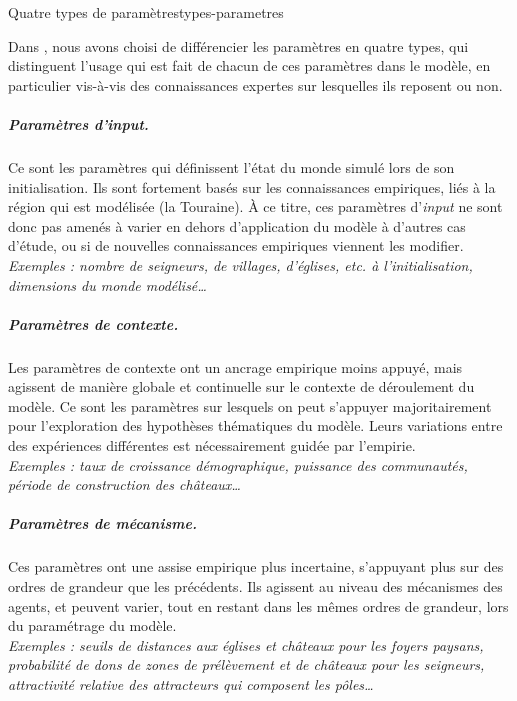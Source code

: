 \begin{encadre}{Quatre types de paramètres}{types-parametres}
\renewcommand{\thempfootnote}{\alph{mpfootnote}}

Dans \simfeodal{}, nous avons choisi de différencier les paramètres en quatre \og types\fg{}, qui distinguent l'usage	qui est fait de chacun de ces paramètres dans le modèle, en particulier vis-à-vis des connaissances expertes sur lesquelles ils reposent ou non.\vspace*{-1em}
	
\subparagraph*{Paramètres d'\textit{input}.}
	Ce sont les paramètres qui définissent l'état du monde simulé lors de son initialisation.
	Ils sont fortement basés sur les connaissances empiriques, liés à la région qui est modélisée (la Touraine).
	À ce titre, ces paramètres d'\textit{input} ne sont donc pas amenés à varier en dehors d'application du modèle à d'autres cas d'étude, ou si de nouvelles connaissances empiriques viennent les modifier.\\
	\textit{Exemples : nombre de seigneurs, de villages, d'églises, etc. à l'initialisation, dimensions du monde modélisé\ldots}\vspace*{-1em}

\subparagraph*{Paramètres de contexte.}
	Les paramètres de contexte ont un ancrage empirique moins appuyé, mais agissent de manière globale et continuelle sur le contexte de déroulement du modèle.
	Ce sont les paramètres sur lesquels on peut s'appuyer majoritairement pour l'exploration des hypothèses thématiques du modèle.
	Leurs variations entre des expériences différentes est nécessairement guidée par l'empirie.\\
	\textit{Exemples : taux de croissance démographique, puissance des communautés, période de construction des châteaux\ldots}\vspace*{-1em}	

\subparagraph*{Paramètres de mécanisme.}
	Ces paramètres ont une assise empirique plus incertaine, s'appuyant plus sur des ordres de grandeur que les précédents.
	Ils agissent au niveau des mécanismes des agents, et peuvent varier, tout en restant dans les mêmes ordres de grandeur, lors du paramétrage du modèle.\\
	\textit{Exemples : seuils de distances aux églises et châteaux pour les foyers paysans, probabilité de dons de zones de prélèvement et de châteaux pour les seigneurs, attractivité relative des attracteurs qui composent les pôles\ldots}\vspace*{-1em}


\end{encadre}
